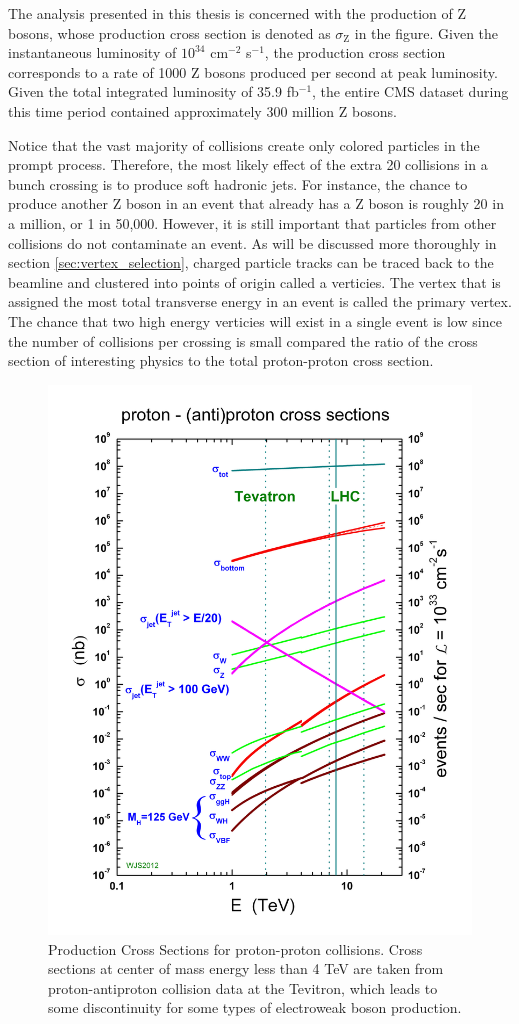     The analysis presented in this thesis is concerned with the production of Z bosons, whose production cross section is denoted as $\sigma_\text{Z}$ in the figure. Given the instantaneous luminosity of $10^{34}$ cm$^{-2}$ s$^{-1}$, the production cross section corresponds to a rate of 1000 Z bosons produced per second at peak luminosity. Given the total integrated luminosity of 35.9 fb$^{-1}$, the entire CMS dataset during this time period contained approximately 300 million Z bosons.

    Notice that the vast majority of collisions create only colored particles in the prompt process. Therefore, the most likely effect of the extra 20 collisions in a bunch crossing is to produce soft hadronic jets. For instance, the chance to produce another Z boson in an event that already has a Z boson is roughly 20 in a million, or 1 in 50,000. However, it is still important that particles from other collisions do not contaminate an event. As will be discussed more thoroughly in section \ref{sec:vertex_selection}, charged particle tracks can be traced back to the beamline and clustered into points of origin called a verticies. The vertex that is assigned the most total transverse energy in an event is called the primary vertex. The chance that two high energy verticies will exist in a single event is low since the number of collisions per crossing is small compared the ratio of the cross section of interesting physics to the total proton-proton cross section.


    \begin{figure}[h!]
      \centering
      \includegraphics[width=.7\textwidth]{figures/lhc_decay_modes.jpg}
      \caption{Production Cross Sections for proton-proton collisions. Cross sections at center of mass energy less than 4 TeV are taken from proton-antiproton collision data at the Tevitron, which leads to some discontinuity for some types of electroweak boson production.}
      \label{fig:lhc_decay_modes}
    \end{figure}

